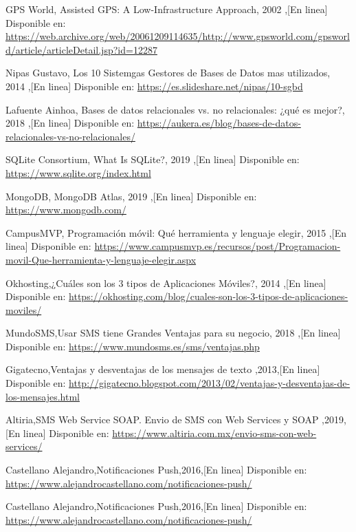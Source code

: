 \begin{thebibliography}{50}
	 GPS World, Assisted GPS: A Low-Infrastructure Approach, 2002 ,[En linea] Disponible en: \url{https://web.archive.org/web/20061209114635/http://www.gpsworld.com/gpsworld/article/articleDetail.jsp?id=12287}	

	 Nipas Gustavo, Los 10 Sistemgas Gestores de Bases de Datos mas utilizados, 2014 ,[En linea] Disponible en: \url{https://es.slideshare.net/nipas/10-sgbd}

	 Lafuente Ainhoa, Bases de datos relacionales vs. no relacionales: ¿qué es mejor?, 2018 ,[En linea] Disponible en: \url{https://aukera.es/blog/bases-de-datos-relacionales-vs-no-relacionales/}

	 SQLite Consortium, What Is SQLite?, 2019 ,[En linea] Disponible en: \url{https://www.sqlite.org/index.html}

	 MongoDB, MongoDB Atlas, 2019 ,[En linea] Disponible en: \url{https://www.mongodb.com/}

	 CampusMVP, Programación móvil: Qué herramienta y lenguaje elegir, 2015 ,[En linea] Disponible en: \url{https://www.campusmvp.es/recursos/post/Programacion-movil-Que-herramienta-y-lenguaje-elegir.aspx}

	 Okhosting,¿Cuáles son los 3 tipos de Aplicaciones Móviles?, 2014 ,[En linea] Disponible en: \url{https://okhosting.com/blog/cuales-son-los-3-tipos-de-aplicaciones-moviles/}

	 MundoSMS,Usar SMS tiene Grandes Ventajas para su negocio, 2018 ,[En linea] Disponible en: \url{https://www.mundosms.es/sms/ventajas.php}

	 Gigatecno,Ventajas y desventajas de los mensajes de texto ,2013,[En linea] Disponible en: \url{http://gigatecno.blogspot.com/2013/02/ventajas-y-desventajas-de-los-mensajes.html}

	 Altiria,SMS Web Service SOAP. Envio de SMS con Web Services y SOAP ,2019,[En linea] Disponible en: \url{https://www.altiria.com.mx/envio-sms-con-web-services/}

	 Castellano Alejandro,Notificaciones Push,2016,[En linea] Disponible en: \url{https://www.alejandrocastellano.com/notificaciones-push/}

	 Castellano Alejandro,Notificaciones Push,2016,[En linea] Disponible en: \url{https://www.alejandrocastellano.com/notificaciones-push/}










\end{thebibliography}
